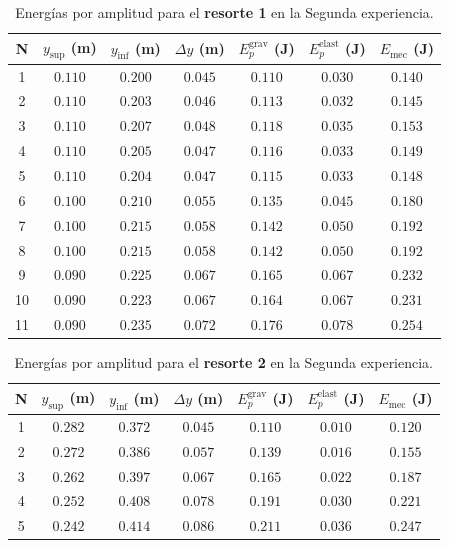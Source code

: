 \documentclass[11pt,twocolumn]{article}
\begin{document}
\begin{table}
\centering
\caption{Energías por amplitud para el \textbf{resorte 1} en la Segunda experiencia.}
\label{tab:energias_resorte1_parte2}
\begin{tabular}{|c|c|c|c|c|c|c|}
\hline
\textbf{N} & \textbf{$y_{\text{sup}}$ (m)} & \textbf{$y_{\text{inf}}$ (m)} & \textbf{$\Delta y$ (m)} & \textbf{$E_p^{\text{grav}}$ (J)} & \textbf{$E_p^{\text{elast}}$ (J)} & \textbf{$E_{\text{mec}}$ (J)} \\ \hline
1  & $0.110$ & $0.200$ & $0.045$ & $0.110$ & $0.030$ & $0.140$ \\ \hline
2  & $0.110$ & $0.203$ & $0.046$ & $0.113$ & $0.032$ & $0.145$ \\ \hline
3  & $0.110$ & $0.207$ & $0.048$ & $0.118$ & $0.035$ & $0.153$ \\ \hline
4  & $0.110$ & $0.205$ & $0.047$ & $0.116$ & $0.033$ & $0.149$ \\ \hline
5  & $0.110$ & $0.204$ & $0.047$ & $0.115$ & $0.033$ & $0.148$ \\ \hline
6  & $0.100$ & $0.210$ & $0.055$ & $0.135$ & $0.045$ & $0.180$ \\ \hline
7  & $0.100$ & $0.215$ & $0.058$ & $0.142$ & $0.050$ & $0.192$ \\ \hline
8  & $0.100$ & $0.215$ & $0.058$ & $0.142$ & $0.050$ & $0.192$ \\ \hline
9  & $0.090$ & $0.225$ & $0.067$ & $0.165$ & $0.067$ & $0.232$ \\ \hline
10 & $0.090$ & $0.223$ & $0.067$ & $0.164$ & $0.067$ & $0.231$ \\ \hline
11 & $0.090$ & $0.235$ & $0.072$ & $0.176$ & $0.078$ & $0.254$ \\ \hline
\end{tabular}
\end{table}

\begin{table}
\centering
\caption{Energías por amplitud para el \textbf{resorte 2} en la Segunda experiencia.}
\label{tab:energias_resorte2_parte2}
\begin{tabular}{|c|c|c|c|c|c|c|}
\hline
\textbf{N} & \textbf{$y_{\text{sup}}$ (m)} & \textbf{$y_{\text{inf}}$ (m)} & \textbf{$\Delta y$ (m)} & \textbf{$E_p^{\text{grav}}$ (J)} & \textbf{$E_p^{\text{elast}}$ (J)} & \textbf{$E_{\text{mec}}$ (J)} \\ \hline
1 & $0.282$ & $0.372$ & $0.045$ & $0.110$ & $0.010$ & $0.120$ \\ \hline
2 & $0.272$ & $0.386$ & $0.057$ & $0.139$ & $0.016$ & $0.155$ \\ \hline
3 & $0.262$ & $0.397$ & $0.067$ & $0.165$ & $0.022$ & $0.187$ \\ \hline
4 & $0.252$ & $0.408$ & $0.078$ & $0.191$ & $0.030$ & $0.221$ \\ \hline
5 & $0.242$ & $0.414$ & $0.086$ & $0.211$ & $0.036$ & $0.247$ \\ \hline
\end{tabular}
\end{table}
\end{document}
